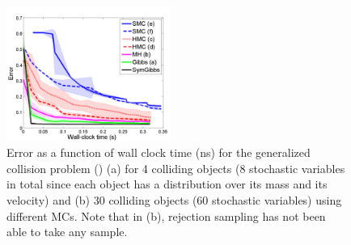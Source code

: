 \documentclass{article}
\begin{document}
\begin{figure}
\centering
     \includegraphics[width=0.8\linewidth, height=125pt]
{plotsx/vis-col/err-vs-time__param2-shaded.pdf}
      \caption{Error
as a function of wall clock time (ns) for the generalized collision problem () 
(a) for 4 colliding objects (8 stochastic variables in total since each object has a distribution over its mass and its velocity) and (b) 30 colliding objects (60 stochastic variables)
using different MCs. Note that in (b), rejection sampling has not been able to take any sample.}
\end{figure}
\end{document}
